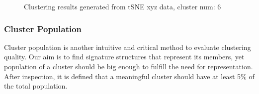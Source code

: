 \documentclass[a4paper]{article}
\begin{document}
\begin{figure}[H]
    \centering
    \caption{Clustering results generated from tSNE xyz data, cluster num: 6}
    \label{fig: clustering tSNE}
\end{figure}

\subsubsection{Cluster Population} \label{sec: lowD_pop}
Cluster population is another intuitive and critical method to evaluate clustering quality. Our aim is to find signature structures that represent its members, yet population of a cluster should be big enough to fulfill the need for representation. After inspection, it is defined that a meaningful cluster should have at least 5\% of the total population.
\end{document}
